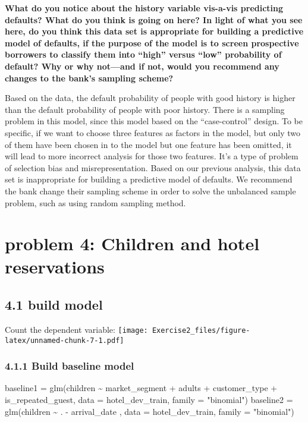 \documentclass[
]{article}
\newenvironment{Shaded}{\begin{snugshade}}{\end{snugshade}}
\newcommand{\AttributeTok}[1]{\textcolor[rgb]{0.77,0.63,0.00}{#1}}
\newcommand{\FunctionTok}[1]{\textcolor[rgb]{0.00,0.00,0.00}{#1}}
\newcommand{\NormalTok}[1]{#1}
\newcommand{\OtherTok}[1]{\textcolor[rgb]{0.56,0.35,0.01}{#1}}
\newcommand{\SpecialCharTok}[1]{\textcolor[rgb]{0.00,0.00,0.00}{#1}}
\newcommand{\StringTok}[1]{\textcolor[rgb]{0.31,0.60,0.02}{#1}}
\begin{document}
\textbf{What do you notice about the history variable vis-a-vis
predicting defaults? What do you think is going on here? In light of
what you see here, do you think this data set is appropriate for
building a predictive model of defaults, if the purpose of the model is
to screen prospective borrowers to classify them into ``high'' versus
``low'' probability of default? Why or why not---and if not, would you
recommend any changes to the bank's sampling scheme?}

Based on the data, the default probability of people with good history
is higher than the default probability of people with poor history.
There is a sampling problem in this model, since this model based on the
``case-control'' design. To be specific, if we want to choose three
features as factors in the model, but only two of them have been chosen
in to the model but one feature has been omitted, it will lead to more
incorrect analysis for those two features. It's a type of problem of
selection bias and misrepresentation. Based on our previous analysis,
this data set is inappropriate for building a predictive model of
defaults. We recommend the bank change their sampling scheme in order to
solve the unbalanced sample problem, such as using random sampling
method.

\hypertarget{problem-4-children-and-hotel-reservations}{%
\section{problem 4: Children and hotel
reservations}\label{problem-4-children-and-hotel-reservations}}

\hypertarget{build-model}{%
\subsection{4.1 build model}\label{build-model}}

Count the dependent variable:
\texttt{[image: Exercise2\_files/figure-latex/unnamed-chunk-7-1.pdf]}

\hypertarget{build-baseline-model}{%
\subsubsection{4.1.1 Build baseline model}\label{build-baseline-model}}

\begin{Shaded}
\begin{Highlighting}[]
\NormalTok{baseline1 }\OtherTok{=} \FunctionTok{glm}\NormalTok{(children }\SpecialCharTok{\textasciitilde{}}\NormalTok{ market\_segment }\SpecialCharTok{+}\NormalTok{ adults }\SpecialCharTok{+}\NormalTok{ customer\_type }\SpecialCharTok{+}\NormalTok{ is\_repeated\_guest,}
                \AttributeTok{data =}\NormalTok{ hotel\_dev\_train, }\AttributeTok{family =} \StringTok{"binomial"}\NormalTok{)}
\NormalTok{baseline2 }\OtherTok{=} \FunctionTok{glm}\NormalTok{(children }\SpecialCharTok{\textasciitilde{}}\NormalTok{ . }\SpecialCharTok{{-}}\NormalTok{ arrival\_date , }\AttributeTok{data =}\NormalTok{ hotel\_dev\_train, }\AttributeTok{family =} \StringTok{"binomial"}\NormalTok{)}
\end{Highlighting}
\end{Shaded}
\end{document}
